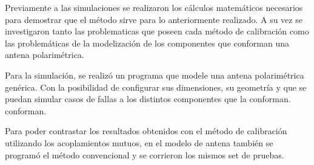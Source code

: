 Previamente a las simulaciones se realizaron los cálculos matemáticos necesarios para demostrar que el método sirve para 
lo anteriormente realizado. A su vez se investigaron tanto las problematicas que poseen cada método de calibración como
las problemáticas de la modelización de los componentes que conforman una antena polarimétrica.

Para la simulación, se realizó un programa que modele una antena polarimétrica genérica. Con la posibilidad de configurar 
sus dimensiones, su geometría y que se puedan simular casos de fallas a los distintos componentes que la conforman.
conforman.

Para poder contrastar los resultados obtenidos con el método de calibración utilizando los acoplamientos mutuos, en el modelo 
de antena también se programó el método convencional y se corrieron los mismos set de pruebas.



